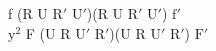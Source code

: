 f (R U $\text{R}'$ $\text{U}'$)(R U $\text{R}'$ $\text{U}'$) $\text{f}'$\\
$\text{y}^2$ F (U R $\text{U}'$ $\text{R}'$)(U R $\text{U}'$ $\text{R}'$) $\text{F}'$\\
\\

